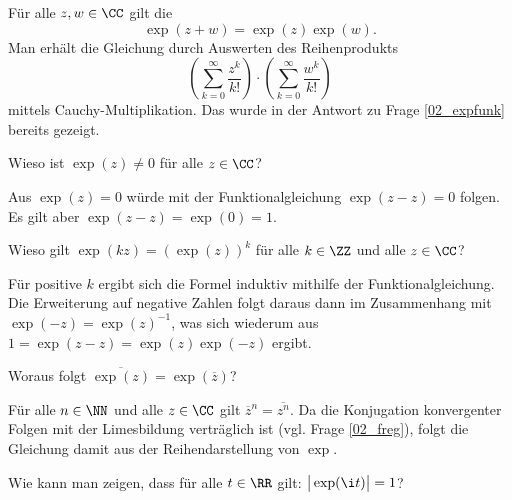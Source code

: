 \begin{antwort}
  Für alle $z,w\in\CC$ gilt die 
  \[
  \boxed{\exp( z+w )=\exp(z)\exp(w).}
  \]
  Man erhält die Gleichung durch Auswerten des 
  Reihenprodukts
  \[
  \left( \sum_{k=0}^\infty \frac{z^k}{k!} \right)\cdot 
  \left( \sum_{k=0}^\infty \frac{w^k}{k!} \right)
  \]
  mittels
  Cauchy-Multiplikation. Das wurde in der 
  Antwort zu Frage \ref{02_expfunk} bereits gezeigt. \AntEnd 
\end{antwort}

\begin{frage}
  Wieso ist $\exp(z)\not=0$ für alle $z\in\CC$?
\end{frage}

\begin{antwort}
  
  Aus $\exp(z)=0$ würde mit der 
  Funktionalgleichung $\exp(z-z)=0$ folgen. Es gilt 
  aber $\exp(z-z)=\exp(0)=1$. \AntEnd
\end{antwort} 

\begin{frage}
  Wieso gilt $\exp(kz)=( \exp(z) )^k$ für alle $k\in \ZZ$ und alle 
  $z\in\CC$?
\end{frage}

\begin{antwort}
  Für positive $k$ ergibt sich die Formel induktiv mithilfe 
  der Funktionalgleichung. Die Erweiterung auf negative Zahlen folgt 
  daraus dann im Zusammenhang mit $\exp(-z)=\exp(z)^{-1}$, was 
  sich wiederum aus $1=\exp(z-z)=\exp(z)\exp(-z)$ ergibt.\AntEnd
\end{antwort}  

\begin{frage}
  Woraus folgt $\overline{\exp(z)} = \exp(\overline{z})$?
\end{frage}

\begin{antwort}
  Für alle $n\in\NN$ und alle $z\in\CC$ gilt 
  $\overline{z}^n = \overline{z^n}$. Da die Konjugation konvergenter 
  Folgen mit der Limesbildung verträglich ist 
  (vgl. Frage \ref{02_freg}), folgt die Gleichung 
  damit aus der Reihendarstellung von $\exp$. \AntEnd
\end{antwort} 

\begin{frage}
  Wie kann man zeigen, dass für alle $t\in \RR$ gilt: 
  $\big| \exp(\i t) \big|=1$?
\end{frage}

